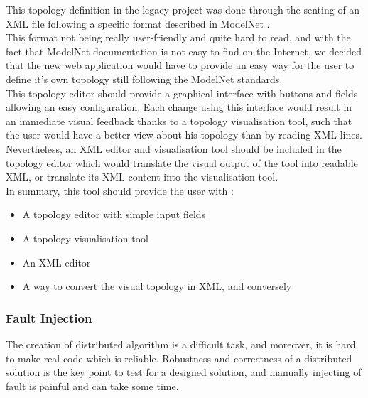 \documentclass{eplmastersthesis}
\begin{document}
          This topology definition in the legacy project was done through
          the senting of an XML file following a specific format described
          in ModelNet \cite{ModelNet}.\\
          This format not being really user-friendly and quite hard to read,
          and with the fact that ModelNet documentation is not easy to find
          on the Internet, we decided that the new web application would have
          to provide an easy way for the user to define it's own topology
          still following the ModelNet standards.\\

          This topology editor should provide a graphical interface with
          buttons and fields allowing an easy configuration. Each change
          using this interface would result in an immediate visual feedback
          thanks to a topology visualisation tool, such that the user would
          have a better view about his topology than by reading XML lines.
          Nevertheless, an XML editor and visualisation tool should be included
          in the topology editor which would translate the visual output of
          the tool into readable XML, or translate its XML content into the
          visualisation tool.\\

          In summary, this tool should provide the user with :

          \begin{itemize}
            \item A topology editor with simple input fields
            \item A topology visualisation tool
            \item An XML editor
            \item A way to convert the visual topology in XML, and conversely
          \end{itemize}

        \subsubsection{Fault Injection}

          The creation of distributed algorithm is a difficult task, and
          moreover, it is hard to make real code which is reliable. Robustness
          and correctness of a distributed solution is the key point to test
          for a designed solution, and manually injecting of fault is painful
          and can take some time. \\
\end{document}
